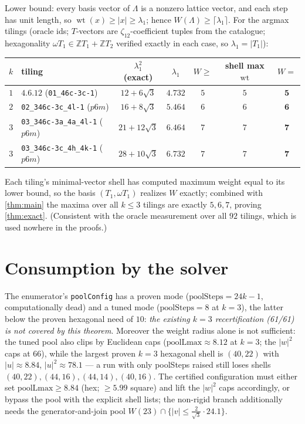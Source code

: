 \documentclass[11pt,a4paper,oneside]{article}
\theoremstyle{plain}
\theoremstyle{definition}
\theoremstyle{remark}
\DeclareMathOperator{\wt}{wt}
\newcommand{\ZZ}{\mathbb{Z}}
\newcommand{\zt}[1]{\zeta_{#1}}
\begin{document}
Lower bound: every basis vector of $\Lambda$ is a nonzero lattice vector, and each step has
unit length, so $\wt(x) \ge |x| \ge \lambda_1$; hence $W(\Lambda) \ge \lceil \lambda_1
\rceil$. For the argmax tilings (oracle ids; $T$-vectors are $\zt{12}$-coefficient tuples
from the catalogue; hexagonality $\omega T_1 \in \ZZ T_1 + \ZZ T_2$ verified exactly in each
case, so $\lambda_1 = |T_1|$):

\begin{center}
\begin{tabular}{clccccc}
\toprule
$k$ & tiling & $\lambda_1^2$ (exact) & $\lambda_1$ & $W \ge$ & shell max $\wt$ & $W =$\\
\midrule
$1$ & $4.6.12$ (\texttt{01\_46c-3c-1}) & $12+6\sqrt3$ & $4.732$ & $5$ & $5$ & $\mathbf{5}$\\
$2$ & \texttt{02\_346c-3c\_4l-1} ($p6m$) & $16+8\sqrt3$ & $5.464$ & $6$ & $6$ & $\mathbf{6}$\\
$3$ & \texttt{03\_346c-3a\_4a\_4l-1} ($p6m$) & $21+12\sqrt3$ & $6.464$ & $7$ & $7$ & $\mathbf{7}$\\
$3$ & \texttt{03\_346c-3c\_4h\_4k-1} ($p6m$) & $28+10\sqrt3$ & $6.732$ & $7$ & $7$ & $\mathbf{7}$\\
\bottomrule
\end{tabular}
\end{center}

Each tiling's minimal-vector shell has computed maximum weight equal to its lower bound, so
the basis $(T_1, \omega T_1)$ realizes $W$ exactly; combined with \cref{thm:main} the maxima
over all $k \le 3$ tilings are exactly $5, 6, 7$, proving \cref{thm:exact}. (Consistent with
the oracle measurement over all $92$ tilings, which is used nowhere in the proofs.)

\section{Consumption by the solver}\label{sec:consumption}

The enumerator's \texttt{poolConfig} has a proven mode ($\text{poolSteps} = 24k{-}1$,
computationally dead) and a tuned mode ($\text{poolSteps} = 8$ at $k=3$), the latter below
the proven hexagonal need of $10$: \emph{the existing $k=3$ recertification (61/61) is not
covered by this theorem}. Moreover the weight radius alone is not sufficient: the tuned
pool also clips by Euclidean caps ($\text{poolLmax} \approx 8.12$ at $k = 3$; the $|w|^2$
caps at $66$), while the largest proven $k{=}3$ hexagonal shell is $(40,22)$ with
$|u| \approx 8.84$, $|u|^2 \approx 78.1$ --- a run with only poolSteps raised still loses
shells $(40,22), (44,16), (44,14), (40,16)$. The certified configuration must either set
$\text{poolLmax} \ge 8.84$ (hex; $\ge 5.99$ square) and lift the $|w|^2$ caps accordingly,
or bypass the pool with the explicit shell lists; the non-rigid branch additionally needs
the generator-and-join pool $W(23) \cap \{|v| \le \tfrac{2}{\sqrt3}\cdot 24.1\}$.
\end{document}
